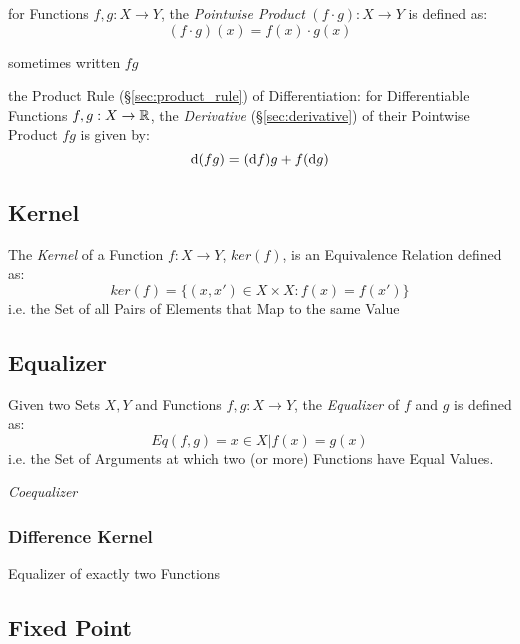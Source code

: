 for Functions $f, g : X \to Y$, the \emph{Pointwise Product}
$(f\cdot{g}) : X \to Y$ is defined as:
\[
  (f \cdot g)(x) = f(x) \cdot g(x)
\]

sometimes written $fg$

the Product Rule (\S\ref{sec:product_rule}) of Differentiation: for
Differentiable Functions $f, g : X \to \mathbb{R}$, the \emph{Derivative}
(\S\ref{sec:derivative}) of their Pointwise Product $fg$ is given by:
\[
  \mathrm{d}(fg) = (\mathrm{d}f)g + f(\mathrm{d}g)
\]



\subsection{Kernel}\label{sec:function_kernel}

The \emph{Kernel} of a Function $f : X \to Y$, $ker(f)$, is an
Equivalence Relation defined as:
\[
  ker(f) = \{ (x,x') \in X \times X : f(x) = f(x') \}
\]
i.e. the Set of all Pairs of Elements that Map to the same Value



\subsection{Equalizer}\label{sec:function_equalizer}

Given two Sets $X,Y$ and Functions $f,g : X \to Y$, the
\emph{Equalizer} of $f$ and $g$ is defined as:
\[
  Eq(f,g) = { x \in X | f(x) = g(x) }
\]
i.e. the Set of Arguments at which two (or more) Functions have Equal
Values.


\emph{Coequalizer}



\subsubsection{Difference Kernel}\label{sec:difference_equalizer}

Equalizer of exactly two Functions



\subsection{Fixed Point}\label{sec:fixed_point}

